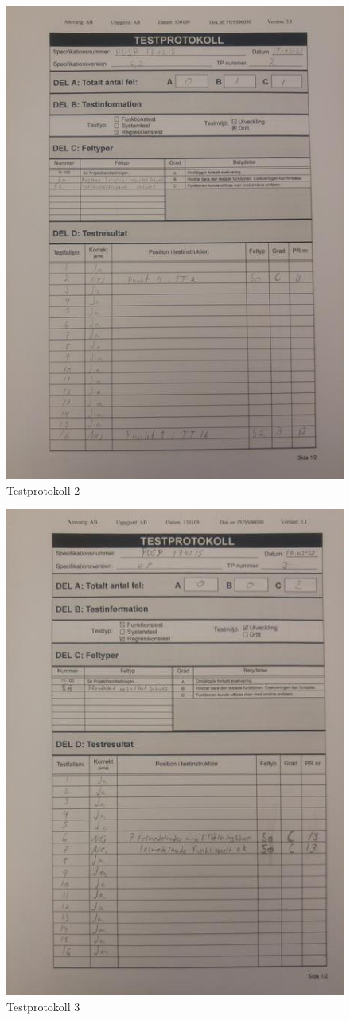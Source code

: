 \documentclass[paper=a4, fontsize=11pt,twoside]{article}
\begin{document}
\begin{figure}[h]
\centering
\includegraphics[width=0.65\linewidth]{test2.jpg}
\caption{Testprotokoll 2}
\label{fig:20170322135648}
\end{figure}

\begin{figure}[h]
\centering
\includegraphics[width=0.65\linewidth]{test3.jpg}
\caption{Testprotokoll 3}
\label{fig:20170322135641}
\end{figure}
\end{document}

